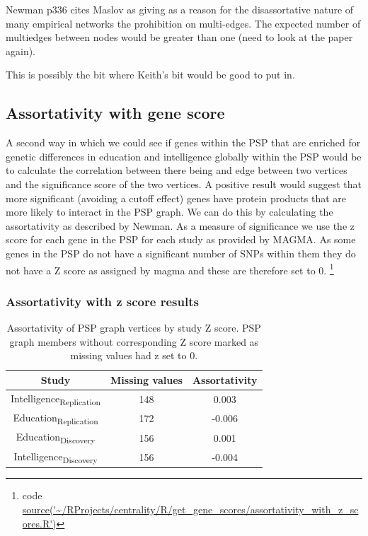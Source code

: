 Newman \cite{newman2018networks} p336 cites Maslov \cite{maslov2004detection} as giving as a reason for the disassortative nature of many empirical networks the prohibition on multi-edges. The expected number of multiedges between nodes would be greater than one (need to look at the paper again).

This is possibly the bit where Keith's bit would be good to put in.  
%
%
%

\subsection{Assortativity with gene score}
 
A second way in which we could see if genes within the PSP that are enriched for genetic differences in education and intelligence globally within the PSP would be to calculate the correlation between there being and edge between two vertices and the significance score of the two vertices. A positive result would suggest that more significant (avoiding a cutoff effect) genes have protein products that are more likely to interact in the PSP graph. We can do this by calculating the assortativity as described by Newman. As a measure of significance we use the z score for each gene in the PSP for each study as provided by MAGMA. As some genes in the PSP do not have a significant number of SNPs within them they do not have a Z score as assigned by magma and these are therefore set to 0. \footnote{code \url{source('~/RProjects/centrality/R/get_gene_scores/assortativity_with_z_scores.R')} }

\subsubsection{Assortativity with z score results}
 
 \begin{table}[]
     \centering
     \begin{tabular}{ccc}
     \toprule
         Study & Missing values  & Assortativity\\
         \midrule
         Intelligence\textsubscript{Replication} & 148 & 0.003\\
         Education\textsubscript{Replication} & 172 & -0.006\\
         Education\textsubscript{Discovery} & 156 & 0.001\\
         Intelligence\textsubscript{Discovery} & 156 & -0.004\\
         \bottomrule
     \end{tabular}
     \caption{Assortativity of PSP graph vertices by study Z score. PSP graph members without corresponding Z score marked as missing values had z set to 0.}
     \label{tab:Assortativity of PSP graph and z scores}
 \end{table}


